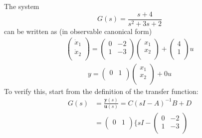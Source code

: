 \begin{itemize}
    \begin{ex}{}
        The system 
        \[G(s) = \frac{s+4}{s^{2}+3s+2}\]
        can be written as  (in observable canonical form)
        \begin{gather*}
        \begin{pmatrix}
        \dot{x}_{1}\\
        \dot{x}_{2}\\
        \end{pmatrix} = 
        \begin{pmatrix}
        0&-2\\
        1&-3\\
        \end{pmatrix}
        \begin{pmatrix}
        x_{1}\\
        x_{2}\\
        \end{pmatrix}
        +
        \begin{pmatrix}
        4\\
        1\\
        \end{pmatrix}u
        \end{gather*}
        \begin{gather*}
        y = 
        \begin{pmatrix}
        0&1\\
        \end{pmatrix}
        \begin{pmatrix}
        x_{1}\\
        x_{2}\\
        \end{pmatrix}
        +0u
        \end{gather*}
        To verify this, start from the definition of the transfer function:
        \begin{equation*}
        \begin{aligned}
        G(s) &= \frac{\mathbf{y}(s)}{\mathbf{u}(s)} = C(sI-A)^{-1}B+D\\
        &= \begin{pmatrix}
         0 & 1\\
        \end{pmatrix}
        \{sI-\begin{pmatrix}
        0&-2\\
        1&-3\\
        \end{pmatrix}

\end{aligned}
\end{equation*}
\end{ex}
\end{itemize}
